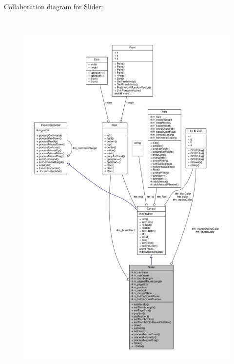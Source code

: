 Collaboration diagram for Slider\+:
\nopagebreak
\begin{figure}[H]
\begin{center}
\leavevmode
\includegraphics[height=550pt]{d5/ddc/classSlider__coll__graph}
\end{center}
\end{figure}
